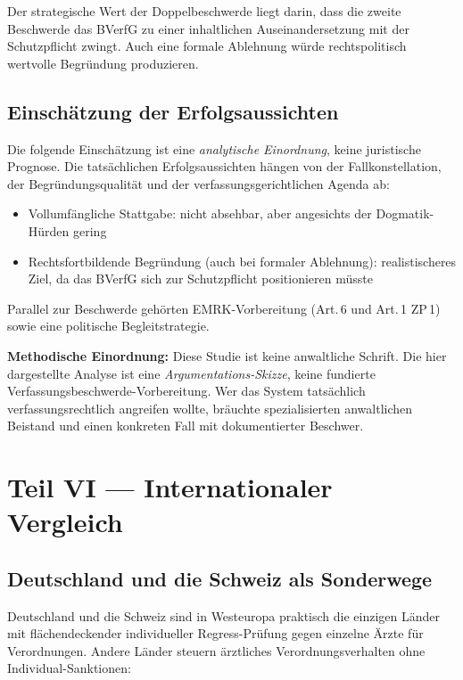 \documentclass{umbruch-position}
\begin{document}
Der strategische Wert der Doppelbeschwerde liegt darin, dass die zweite Beschwerde das BVerfG zu einer inhaltlichen Auseinandersetzung mit der Schutzpflicht zwingt. Auch eine formale Ablehnung würde rechtspolitisch wertvolle Begründung produzieren.

\subsection{Einschätzung der Erfolgsaussichten}

Die folgende Einschätzung ist eine \textit{analytische Einordnung}, keine juristische Prognose. Die tatsächlichen Erfolgsaussichten hängen von der Fallkonstellation, der Begründungsqualität und der verfassungsgerichtlichen Agenda ab:

\begin{itemize}[nosep]
  \item Vollumfängliche Stattgabe: nicht absehbar, aber angesichts der Dogmatik-Hürden gering
  \item Rechtsfortbildende Begründung (auch bei formaler Ablehnung): realistischeres Ziel, da das BVerfG sich zur Schutzpflicht positionieren müsste
\end{itemize}

Parallel zur Beschwerde gehörten EMRK-Vorbereitung (Art.\,6 und Art.\,1 ZP\,1) sowie eine politische Begleitstrategie.

\textbf{Methodische Einordnung:} Diese Studie ist keine anwaltliche Schrift. Die hier dargestellte Analyse ist eine \textit{Argumentations-Skizze}, keine fundierte Verfassungsbeschwerde-Vorbereitung. Wer das System tatsächlich verfassungsrechtlich angreifen wollte, bräuchte spezialisierten anwaltlichen Beistand und einen konkreten Fall mit dokumentierter Beschwer.


\section{Teil VI --- Internationaler Vergleich}

\subsection{Deutschland und die Schweiz als Sonderwege}

Deutschland und die Schweiz sind in Westeuropa praktisch die einzigen Länder mit flächendeckender individueller Regress-Prüfung gegen einzelne Ärzte für Verordnungen. Andere Länder steuern ärztliches Verordnungsverhalten ohne Individual-Sanktionen:
\end{document}
